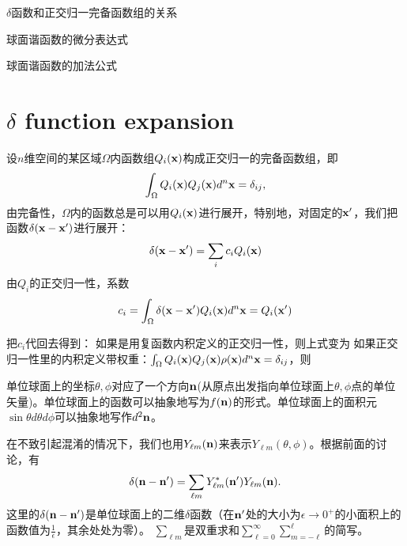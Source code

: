 \documentclass[CJK]{beamer}
\date{}
\begin{document}

\begin{frame}
\bch
\bitem
\item{$\delta$函数和正交归一完备函数组的关系}
\item{球面谐函数的微分表达式}
\item{球面谐函数的加法公式}
\eitem
\ech
\end{frame}

\section{$\delta$ function expansion}

\begin{frame}
  \bch
  设$n$维空间的某区域$\Omega$内函数组$Q_i({\mathbf{x}})$构成正交归一的完备函数组，即
  $$\int_\Omega Q_i({\mathbf{x}})Q_j({\mathbf{x}}) d^n{\mathbf{x}} = \delta_{ij},$$
  由完备性，$\Omega$内的函数总是可以用$Q_i({\mathbf{x}})$进行展开，特别地，对固定的${\mathbf{x}}'$，我们把函数$\delta({\mathbf{x}}-{\mathbf{x}}')$进行展开：
  $$\delta({\mathbf{x}}-{\mathbf{x}}') = \sum_i c_iQ_i({\mathbf{x}})$$
  由$Q_i$的正交归一性，系数
  $$c_i = \int_\Omega \delta({\mathbf{x}}-{\mathbf{x}}')Q_i({\mathbf{x}}) d^n{\mathbf{x}} = Q_i({\mathbf{x}}')$$
  
  \ech
\end{frame}


\begin{frame}
  \bch
  把$c_i$代回去得到：
  如果是用{\blue 复函数内积定义的正交归一性}，则上式变为
  如果正交归一性里的内积定义带权重：$\int_\Omega Q_i({\mathbf{x}})Q_j({\mathbf{x}})\rho({\mathbf{x}})d^n{\mathbf{x}} = \delta_{ij} $，则


  \ech
\end{frame}

\begin{frame}
  \bch
  单位球面上的坐标$\theta,\phi$对应了一个方向${\mathbf{n}}$(从原点出发指向单位球面上$\theta,\phi$点的单位矢量)。单位球面上的函数可以抽象地写为$f({\mathbf{n}})$的形式。单位球面上的面积元$\sin\theta d\theta d\phi$可以抽象地写作$d^2{\mathbf{n}}$。
  

  \skipline
  
  在不致引起混淆的情况下，我们也{\blue 用$Y_{\ell m}({\mathbf{n}})$来表示$Y_{\ell m}(\theta,\phi)$}。根据前面的讨论，有
{\blue
  $$\delta({\mathbf{n}}-{\mathbf{n}}') = \sum_{\ell m} Y_{\ell m}^*({\mathbf{n}}') Y_{\ell m}({\mathbf{n}}).$$}
这里的$\delta({\mathbf{n}}-{\mathbf{n}}')$是单位球面上的二维$\delta$函数（在${\mathbf{n}}'$处的大小为$\epsilon\rightarrow 0^+$的小面积上的函数值为$\frac{1}{\epsilon}$，其余处处为零）。
$\sum_{\ell m}$是双重求和$\sum_{\ell = 0}^\infty\sum_{m =-\ell}^\ell $的简写。
  \ech
\end{frame}
\end{document}
